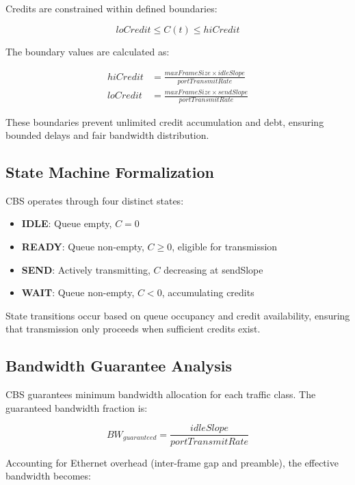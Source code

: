 \documentclass[10pt, journal, compsoc]{IEEEtran}
\begin{document}
Credits are constrained within defined boundaries:

\begin{equation}
loCredit \leq C(t) \leq hiCredit
\end{equation}

The boundary values are calculated as:

\begin{align}
hiCredit &= \frac{maxFrameSize \times idleSlope}{portTransmitRate} \\
loCredit &= \frac{maxFrameSize \times sendSlope}{portTransmitRate}
\end{align}

These boundaries prevent unlimited credit accumulation and debt, ensuring bounded delays and fair bandwidth distribution.

\subsection{State Machine Formalization}

CBS operates through four distinct states:

\begin{itemize}
    \item \textbf{IDLE}: Queue empty, $C = 0$
    \item \textbf{READY}: Queue non-empty, $C \geq 0$, eligible for transmission
    \item \textbf{SEND}: Actively transmitting, $C$ decreasing at sendSlope
    \item \textbf{WAIT}: Queue non-empty, $C < 0$, accumulating credits
\end{itemize}

State transitions occur based on queue occupancy and credit availability, ensuring that transmission only proceeds when sufficient credits exist.

\subsection{Bandwidth Guarantee Analysis}

CBS guarantees minimum bandwidth allocation for each traffic class. The guaranteed bandwidth fraction is:

\begin{equation}
BW_{guaranteed} = \frac{idleSlope}{portTransmitRate}
\end{equation}

Accounting for Ethernet overhead (inter-frame gap and preamble), the effective bandwidth becomes:
\end{document}
